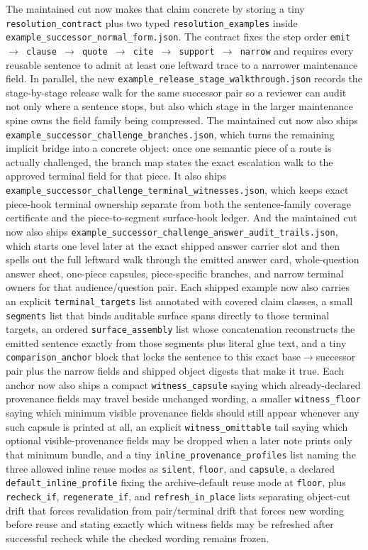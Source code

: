 \documentclass[11pt]{article}
\begin{document}
The maintained cut now makes that claim concrete by storing a tiny \texttt{resolution\_contract} plus two typed \texttt{resolution\_examples} inside \texttt{example\_successor\_normal\_form.json}.
The contract fixes the step order \texttt{emit $\to$ clause $\to$ quote $\to$ cite $\to$ support $\to$ narrow} and requires every reusable sentence to admit at least one leftward trace to a narrower maintenance field. In parallel, the new \texttt{example\_release\_stage\_walkthrough.json} records the stage-by-stage release walk for the same successor pair so a reviewer can audit not only where a sentence stops, but also which stage in the larger maintenance spine owns the field family being compressed. The maintained cut now also ships \texttt{example\_successor\_challenge\_branches.json}, which turns the remaining implicit bridge into a concrete object: once one semantic piece of a route is actually challenged, the branch map states the exact escalation walk to the approved terminal field for that piece. It also ships \texttt{example\_successor\_challenge\_terminal\_witnesses.json}, which keeps exact piece-hook terminal ownership separate from both the sentence-family coverage certificate and the piece-to-segment surface-hook ledger. And the maintained cut now also ships \texttt{example\_successor\_challenge\_answer\_audit\_trails.json}, which starts one level later at the exact shipped answer carrier slot and then spells out the full leftward walk through the emitted answer card, whole-question answer sheet, one-piece capsules, piece-specific branches, and narrow terminal owners for that audience/question pair.
Each shipped example now also carries an explicit \texttt{terminal\_targets} list annotated with covered claim classes, a small \texttt{segments} list that binds auditable surface spans directly to those terminal targets, an ordered \texttt{surface\_assembly} list whose concatenation reconstructs the emitted sentence exactly from those segments plus literal glue text, and a tiny \texttt{comparison\_anchor} block that locks the sentence to this exact base$\to$successor pair plus the narrow fields and shipped object digests that make it true. Each anchor now also ships a compact \texttt{witness\_capsule} saying which already-declared provenance fields may travel beside unchanged wording, a smaller \texttt{witness\_floor} saying which minimum visible provenance fields should still appear whenever any such capsule is printed at all, an explicit \texttt{witness\_omittable} tail saying which optional visible-provenance fields may be dropped when a later note prints only that minimum bundle, and a tiny \texttt{inline\_provenance\_profiles} list naming the three allowed inline reuse modes as \texttt{silent}, \texttt{floor}, and \texttt{capsule}, a declared \texttt{default\_inline\_profile} fixing the archive-default reuse mode at \texttt{floor}, plus \texttt{recheck\_if}, \texttt{regenerate\_if}, and \texttt{refresh\_in\_place} lists separating object-cut drift that forces revalidation from pair/terminal drift that forces new wording before reuse and stating exactly which witness fields may be refreshed after successful recheck while the checked wording remains frozen.
\end{document}
